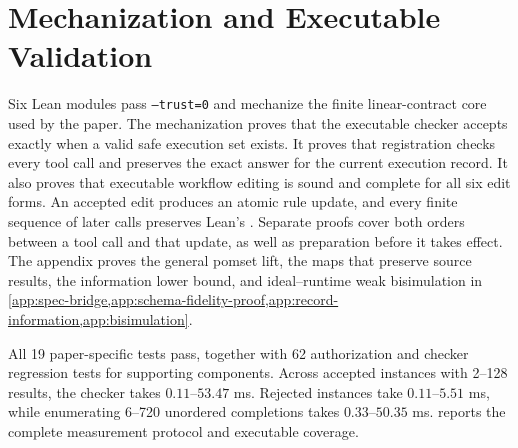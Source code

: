 \section{Mechanization and Executable Validation}
\label{sec:validation}

Six Lean modules pass \texttt{--trust=0} and mechanize the finite linear-contract core used by the paper.
The mechanization proves that the executable checker accepts exactly when a valid safe execution set exists.
It proves that registration checks every tool call and preserves the exact answer for the current execution record.
It also proves that executable workflow editing is sound and complete for all six edit forms.
An accepted edit produces an atomic rule update, and every finite sequence of later calls preserves Lean's .
Separate proofs cover both orders between a tool call and that update, as well as preparation before it takes effect.
The appendix proves the general pomset lift, the maps that preserve source results, the information lower bound, and ideal--runtime weak bisimulation in \cref{app:spec-bridge,app:schema-fidelity-proof,app:record-information,app:bisimulation}.

All 19 paper-specific tests pass, together with 62 authorization and checker regression tests for supporting components.
Across accepted instances with 2--128 results, the checker takes \(0.11\)--\(53.47\) ms.
Rejected instances take \(0.11\)--\(5.51\) ms, while enumerating 6--720 unordered completions takes \(0.33\)--\(50.35\) ms.
 reports the complete measurement protocol and executable coverage.

